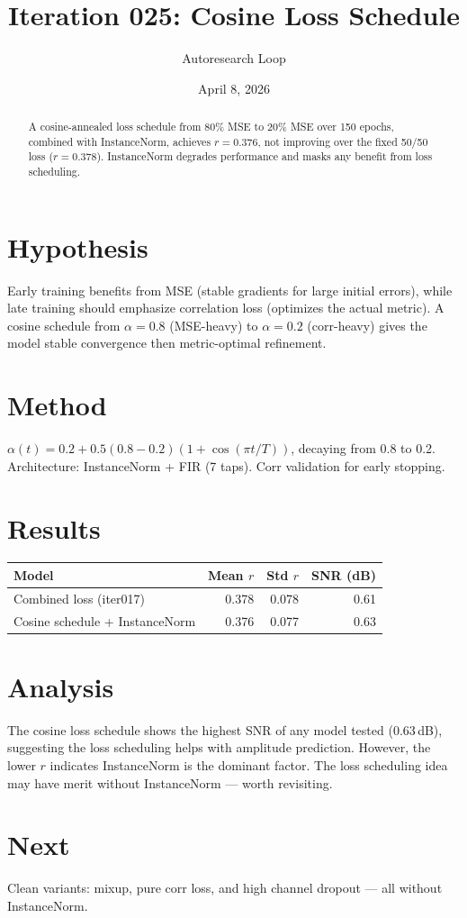 \documentclass[11pt,a4paper]{article}
\title{Iteration 025: Cosine Loss Schedule}
\author{Autoresearch Loop}
\date{April 8, 2026}
\begin{document}
\maketitle

\begin{abstract}
A cosine-annealed loss schedule from 80\% MSE to 20\% MSE over 150 epochs,
combined with InstanceNorm, achieves $r=0.376$, not improving over the
fixed 50/50 loss ($r=0.378$). InstanceNorm degrades performance and masks
any benefit from loss scheduling.
\end{abstract}

\section{Hypothesis}
Early training benefits from MSE (stable gradients for large initial errors),
while late training should emphasize correlation loss (optimizes the actual
metric). A cosine schedule from $\alpha=0.8$ (MSE-heavy) to $\alpha=0.2$
(corr-heavy) gives the model stable convergence then metric-optimal refinement.

\section{Method}
$\alpha(t) = 0.2 + 0.5(0.8-0.2)(1+\cos(\pi t/T))$, decaying from 0.8 to 0.2.
Architecture: InstanceNorm + FIR (7 taps). Corr validation for early stopping.

\section{Results}
\begin{table}[H]
\centering
\begin{tabular}{lrrr}
\toprule
Model & Mean $r$ & Std $r$ & SNR (dB) \\
\midrule
Combined loss (iter017) & 0.378 & 0.078 & 0.61 \\
Cosine schedule + InstanceNorm & 0.376 & 0.077 & 0.63 \\
\bottomrule
\end{tabular}
\end{table}

\section{Analysis}
The cosine loss schedule shows the highest SNR of any model tested (0.63\,dB),
suggesting the loss scheduling helps with amplitude prediction. However, the
lower $r$ indicates InstanceNorm is the dominant factor. The loss scheduling
idea may have merit without InstanceNorm --- worth revisiting.

\section{Next}
Clean variants: mixup, pure corr loss, and high channel dropout --- all without InstanceNorm.
\end{document}
